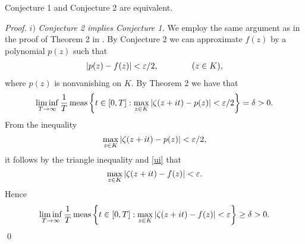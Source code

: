 \documentclass[11pt]{article}
\begin{document}
\begin{thm} Conjecture 1 and Conjecture 2 are equivalent. \end{thm}
\begin{proof} $i)$ {\em Conjecture 2 implies Conjecture 1.} We employ the same argument as in the proof of Theorem 2 in \cite{Andersson}.  By Conjecture 2 we can approximate $f(z)$ by a polynomial $p(z)$ such that \begin{gather} \label{ui} \abs{p(z)-f(z)}< \varepsilon/2,  \qquad \qquad (z \in K), \end{gather}
where $p(z)$ is nonvanishing on $K$. By Theorem 2  we  have that  
$$\liminf_{T \to \infty} \frac 1 T \mathop{\rm meas} \left \{t \in [0,T]:\max_{z \in K} {\left| {\zeta(z+it)-p(z)} \right|}<\varepsilon/2 \right \}=\delta>0. $$
From the inequality
$$\max_{z \in K} {\left| {\zeta(z+it)-p(z)} \right|}<\varepsilon/2,$$
it follows by  the  triangle inequality and \eqref{ui} that 
$$\max_{z \in K} {\left| {\zeta(z+it)-f(z)} \right|}<\varepsilon.$$
Hence 
$$\liminf_{T \to \infty} \frac 1 T \mathop{\rm meas} \left \{t \in [0,T]:\max_{z \in K} {\left| {\zeta(z+it)-f(z)} \right|}<\varepsilon \right \}\geq\delta>0. $$ \qed


\end{proof}
\end{document}
